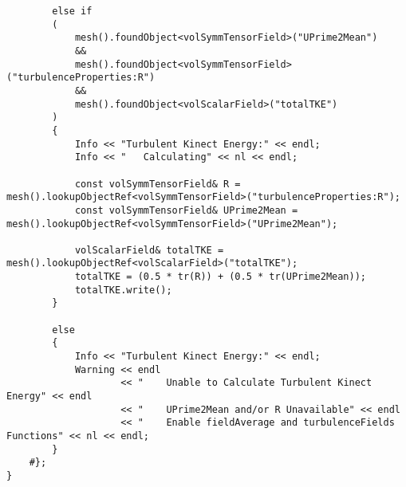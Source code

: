 \documentclass[../main.tex]{subfiles}
\begin{document}
\begin{lstlisting}
		else if
		(
			mesh().foundObject<volSymmTensorField>("UPrime2Mean")
			&&
			mesh().foundObject<volSymmTensorField>("turbulenceProperties:R")
			&&
			mesh().foundObject<volScalarField>("totalTKE")
		)
		{
			Info << "Turbulent Kinect Energy:" << endl;
			Info << "	Calculating" << nl << endl;

			const volSymmTensorField& R = mesh().lookupObjectRef<volSymmTensorField>("turbulenceProperties:R");
			const volSymmTensorField& UPrime2Mean = mesh().lookupObjectRef<volSymmTensorField>("UPrime2Mean");

			volScalarField& totalTKE = mesh().lookupObjectRef<volScalarField>("totalTKE");
			totalTKE = (0.5 * tr(R)) + (0.5 * tr(UPrime2Mean));
			totalTKE.write();
		}

		else
		{
			Info << "Turbulent Kinect Energy:" << endl;
			Warning << endl
					<< "	Unable to Calculate Turbulent Kinect Energy" << endl
					<< "	UPrime2Mean and/or R Unavailable" << endl
					<< "	Enable fieldAverage and turbulenceFields Functions" << nl << endl;
		}
	#};
}
\end{lstlisting}
\end{document}

